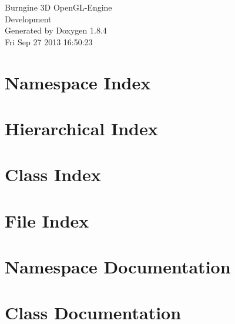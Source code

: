 \documentclass[twoside]{book}
\newcommand{\clearemptydoublepage}{%
  \newpage{\pagestyle{empty}\cleardoublepage}%
}
\begin{document}
\hypersetup{pageanchor=false}
\begin{titlepage}
\vspace*{7cm}
\begin{center}%
{\Large Burngine 3\-D Open\-G\-L-\/\-Engine \\[1ex]\large Development }\\
\vspace*{1cm}
{\large Generated by Doxygen 1.8.4}\\
\vspace*{0.5cm}
{\small Fri Sep 27 2013 16:50:23}\\
\end{center}
\end{titlepage}
\clearemptydoublepage
\tableofcontents
\clearemptydoublepage
{}
\hypersetup{pageanchor=true}

\chapter{Namespace Index}

\chapter{Hierarchical Index}

\chapter{Class Index}

\chapter{File Index}

\chapter{Namespace Documentation}

\chapter{Class Documentation}


















\end{document}
